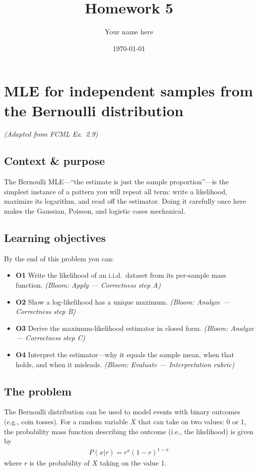 \documentclass[11pt]{article}
\title{Homework 5}
\author{Your name here}
\date{\today{}}
\begin{document}
\maketitle

\section{MLE for independent samples from the Bernoulli distribution}

\emph{(Adapted from FCML Ex.~2.9)}

\subsection*{Context \& purpose}

\noindent The Bernoulli MLE---``the estimate is just the sample
proportion''---is the simplest instance of a pattern you will repeat all term:
write a likelihood, maximize its logarithm, and read off the estimator. Doing it
carefully once here makes the Gaussian, Poisson, and logistic cases mechanical.

\subsection*{Learning objectives}

\noindent By the end of this problem you can:
\begin{itemize}
    \item \textbf{O1} Write the likelihood of an i.i.d.\ dataset from its
        per-sample mass function. \emph{(Bloom: Apply --- Correctness step A)}
    \item \textbf{O2} Show a log-likelihood has a unique maximum. \emph{(Bloom:
        Analyze --- Correctness step B)}
    \item \textbf{O3} Derive the maximum-likelihood estimator in closed form.
        \emph{(Bloom: Analyze --- Correctness step C)}
    \item \textbf{O4} Interpret the estimator---why it equals the sample mean,
        when that holds, and when it misleads. \emph{(Bloom: Evaluate ---
        Interpretation rubric)}
\end{itemize}

\subsection*{The problem}

\noindent The Bernoulli distribution can be used to model events with binary outcomes
(e.g., coin tosses). For a random variable $X$ that can take on two values: 0 or
1, the probability mass function describing the outcome (i.e., the likelihood) is given by
\begin{align}
P(x|r) = r^x(1-r)^{1-x}
\end{align}
where $r$ is the probability of $X$ taking on the value 1.
\end{document}
